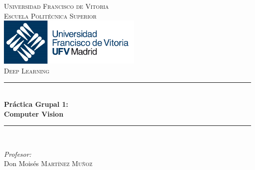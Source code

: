 \documentclass{article}
\begin{document}
\begin{titlepage}

\newcommand{\HRule}{\rule{\linewidth}{0.5mm}} 

\center 
 

\textsc{\LARGE Universidad Francisco de Vitoria}\\[1.5cm] 
\textsc{\LARGE Escuela Politécnica Superior}\\[1.5cm] 

\includegraphics[width=7cm]{imagenes/logo_ufv.png}\\[1cm] 
\textsc{\Large Deep Learning}\\[1cm]



\HRule \\[0.4cm]
{ \huge \bfseries Práctica Grupal 1: \\
Computer Vision}\\[0.4cm] %
\HRule \\[1.5cm]
 

\begin{minipage}{0.5\textwidth}
    \begin{flushleft} \large
        \emph{Profesor:}\\
            Don Moisés \textsc{Martínez Muñoz}\\ 
    \end{flushleft}
        

\end{minipage}
\end{titlepage}
\end{document}
